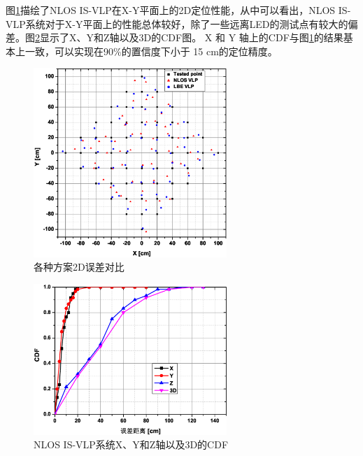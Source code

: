 图\ref{fig:2Derrorcompensation}描绘了NLOS IS-VLP在X-Y平面上的2D定位性能，从中可以看出，NLOS IS-VLP系统对于X-Y平面上的性能总体较好，除了一些远离LED的测试点有较大的偏差。图\ref{fig:NLOS VLP system error}显示了X、Y和Z轴以及3D的CDF图。 X 和 Y 轴上的CDF与图\ref{fig:2Derrorcompensation}的结果基本上一致，可以实现在90$\%$的置信度下小于 15 cm的定位精度。


\begin{figure}[!htbp]
\centering\includegraphics[width=0.65\textwidth]{FIG/2derror2.eps}
\caption{各种方案2D误差对比}
\label{fig:2Derrorcompensation}
\end{figure}

\begin{figure}[!htbp]
\centering\includegraphics[width=0.65\textwidth]{FIG/517-b.eps}
\caption{NLOS IS-VLP系统X、Y和Z轴以及3D的CDF}
\label{fig:NLOS VLP system error}
\end{figure}


